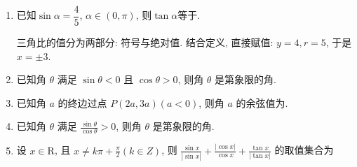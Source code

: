 \begin{enumerate}
\item 已知$\sin\alpha=\dfrac{4}{5}$, $\alpha\in(0,\pi)$, 则$\tan\alpha$等于. 
\begin{jieda}
三角比的值分为两部分: 符号与绝对值. 结合定义, 直接赋值: $y=4,r=5$, 于是$x=\pm3$. 
\end{jieda}


\item 已知角 $\theta$ 满足 $\sin \theta<0$ 且 $\cos \theta>0$, 则角 $\theta$ 是第象限的角.

\item 已知角 $a$ 的终边过点 $P(2 a, 3 a)(a<0)$, 则角 $a$ 的余弦值为.


\item 已知角 $\theta$ 满足 $\frac{\sin \theta}{\cos \theta}>0$, 则角 $\theta$ 是第象限的角.


\item 设 $x \in \mathrm{R}$, 且 $x \neq k \pi+\frac{\pi}{2}(k \in Z)$, 则 $\frac{\sin x}{|\sin x|}+\frac{|\cos x|}{\cos x}+\frac{\tan x}{|\tan x|}$ 的取值集合为


\end{enumerate}

